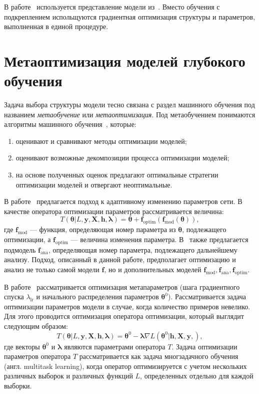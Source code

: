 В работе~\cite{darts} используется представление модели из~\cite{reinf_transfer}. Вместо обучения с подкреплением испольщуются градиентная оптимизация структуры и параметров, выполненная в единой процедуре.

\section{Метаоптимизация моделей глубокого обучения}
Задача выбора структуры модели тесно связана с раздел машинного обучения под названием \textit{метаобучение} или \textit{метаоптимизация}. Под метаобучением понимаются алгоритмы машинного обучения~\cite{metalearn}, которые:
\begin{enumerate}[1)]
\item оценивают и сравнивают методы оптимизации моделей;
\item оценивают возможные декомпозиции процесса оптимизации моделей;
\item на основе полученных оценок предлагают оптимальные стратегии оптимизации моделей и отвергают неоптимальные. 
\end{enumerate}

В работе~\cite{self_rnn} предлагается подход к адаптивному изменению параметров сети. В качестве оператора оптимизации параметров рассматривается величина:
\[
    T( \boldsymbol{\theta}| L, \mathbf{y}, \mathbf{X}, \mathbf{h}, \boldsymbol{\lambda}) = \boldsymbol{\theta} + \mathbf{f}_\text{optim}(\mathbf{f}_\text{mod}( \boldsymbol{\theta})),
\]
где $\mathbf{f}_\text{mod}$ --- функция, определяющая номер параметра из $\boldsymbol{\theta}$, подлежащего оптимизации, а $ \mathbf{f}_\text{optim}$ --- величина изменения параметра. 
В~\cite{self_rnn} также предлагается подмодель $\mathbf{f}_\text{ana}$, определяющая номер параметра, подлежащего дальнейшему анализу. Подход, описанный в данной работе, предполагает оптимизацию и анализ не только самой модели $\mathbf{f}$, но и дополнительных моделей $\mathbf{f}_\text{mod}, \mathbf{f}_\text{ana}, \mathbf{f}_\text{optim}$.

В работе~\cite{meta_sgd} рассматривается оптимизация метапараметров (шага градиентного спуска $\lambda_{\text{lr}}$ и начального распределения параметров $\boldsymbol{\theta}^0$). Рассматривается задача оптимизации параметров модели в случае, когда количество примеров невелико. Для этого проводится оптимизация оператора оптимизации, который выглядит следующим образом:
\[
    T(\boldsymbol{\theta}| L, \mathbf{y}, \mathbf{X},  \mathbf{h}, \boldsymbol{\lambda})  = \boldsymbol{\theta}^0 - \boldsymbol{\lambda}\nabla L(\boldsymbol{\theta}^0| \mathbf{h}, \mathbf{X}, \mathbf{y},),
\]
где векторы $\boldsymbol{\theta}^0$ и $\boldsymbol{\lambda}$ являются параметрами оператора $T$. Задача оптимизации параметров оператора $T$ рассматривается как задача многзадачного обучения (англ. multitask learning), когда оператор оптимизируется с учетом нескольких различных выборок и различных функций $L$, определенных отдельно для каждой выборки.



